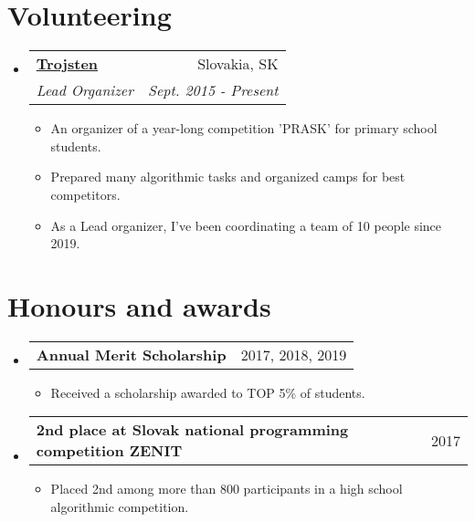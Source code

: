 \documentclass[letterpaper,11pt]{article}
\makeatletter
\newcommand{\resumeItem}[2]{
  \item\small{
    \textbf{#1}{#2 \vspace{-2pt}}
  }
}
\newcommand{\resumeSubheading}[4]{
  \vspace{-1pt}\item
    \begin{tabular*}{0.97\textwidth}{l@{\extracolsep{\fill}}r}
      \textbf{#1} & #2 \\
      \textit{\small#3} & \textit{\small #4} \\
    \end{tabular*}\vspace{-5pt}
}
\newcommand{\resumeSubheadingMY}[4]{
  \vspace{-1pt}\item
    \begin{tabular*}{0.97\textwidth}{l@{\extracolsep{\fill}}r}
      \textbf{#1} & #2 \\
    \end{tabular*}\vspace{-5pt}
}
\newcommand{\resumeSubHeadingListStart}{\begin{itemize}[leftmargin=*]}
\newcommand{\resumeSubHeadingListEnd}{\end{itemize}}
\newcommand{\resumeItemListStart}{\begin{itemize}}
\newcommand{\resumeItemListEnd}{\end{itemize}\vspace{-5pt}}
\makeatother
\begin{document}
\section{Volunteering}
  \resumeSubHeadingListStart
    \resumeSubheading
      {\href{https://www.trojsten.sk/}{Trojsten}}{Slovakia, SK}
      {Lead Organizer}{Sept. 2015 - Present}
      \resumeItemListStart
        \resumeItem{}
          {An organizer of a year-long competition 'PRASK' for primary school students.}
	\resumeItem{}
	  {Prepared many algorithmic tasks and organized camps for best competitors.}
        \resumeItem{}
          {As a Lead organizer, I've been coordinating a team of 10 people since 2019.}
      \resumeItemListEnd
  \resumeSubHeadingListEnd
  
 \section{Honours and awards}
  \resumeSubHeadingListStart
    \resumeSubheadingMY
      {Annual Merit Scholarship}{2017, 2018, 2019}
      {}{}
      \resumeItemListStart
        \resumeItem{}
          {Received a scholarship awarded to TOP 5\% of students.}
      \resumeItemListEnd
     \resumeSubheadingMY
      {2nd place at Slovak national programming competition ZENIT}{2017}
      {}{}
      \resumeItemListStart
        \resumeItem{}
          {Placed 2nd among more than 800 participants in a high school algorithmic competition.}
      \resumeItemListEnd
      
  \resumeSubHeadingListEnd

\end{document}
